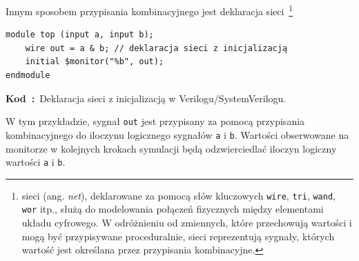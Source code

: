 \documentclass[shortabstract, inz]{iithesis}
\newcounter{kod}[chapter]
\renewcommand{\thekod}{\thechapter\arabic{kod}}
\newcommand{\codecaption}[2]{%
  \par\refstepcounter{kod}\label{#1}%
  \noindent\textbf{Kod~\thekod:}~#2\par
  \vspace*{1.0\baselineskip}%
}
\begin{document}
Innym sposobem przypisania kombinacyjnego jest deklaracja sieci~\footnote{sieci (ang. \textit{net}), deklarowane za pomocą słów kluczowych \texttt{wire}, \texttt{tri}, \texttt{wand}, \texttt{wor} itp., służą do modelowania połączeń fizycznych między elementami układu cyfrowego. W odróżnieniu od zmiennych, które przechowują wartości i mogą być przypisywane proceduralnie, sieci reprezentują sygnały, których wartość jest określana przez przypisania kombinacyjne.}

\begin{verbatim}
module top (input a, input b);
    wire out = a & b; // deklaracja sieci z inicjalizacją
    initial $monitor("%b", out);
endmodule
\end{verbatim}
\codecaption{lst:net-decl-assign}{Deklaracja sieci z inicjalizacją w Verilogu/SystemVerilogu.}
W tym przykładzie, sygnał \texttt{out} jest przypisany za pomocą przypisania kombinacyjnego do iloczynu logicznego sygnałów \texttt{a} i \texttt{b}. Wartości obserwowane na monitorze w kolejnych krokach symulacji będą odzwierciedlać iloczyn logiczny wartości \texttt{a} i \texttt{b}.
\end{document}
